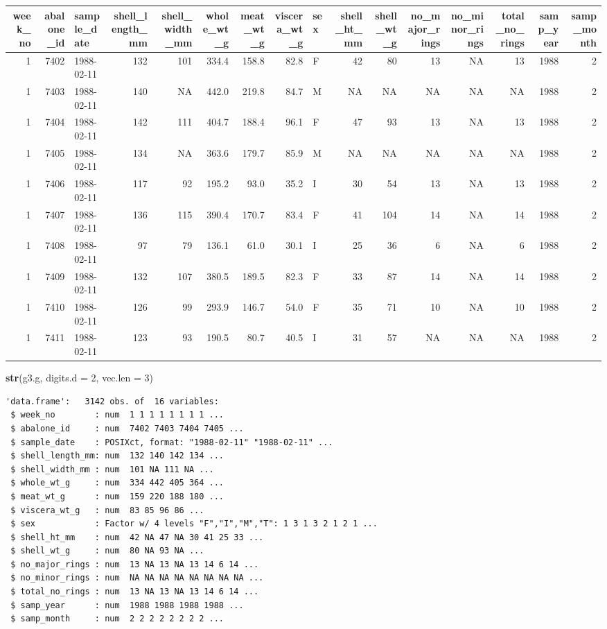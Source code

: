 \documentclass[]{article}
\newenvironment{Shaded}{\begin{snugshade}}{\end{snugshade}}
\newcommand{\DataTypeTok}[1]{\textcolor[rgb]{0.13,0.29,0.53}{#1}}
\newcommand{\DecValTok}[1]{\textcolor[rgb]{0.00,0.00,0.81}{#1}}
\newcommand{\KeywordTok}[1]{\textcolor[rgb]{0.13,0.29,0.53}{\textbf{#1}}}
\newcommand{\NormalTok}[1]{#1}
\begin{document}
\begin{tabular}{r|r|l|r|r|r|r|r|l|r|r|r|r|r|r|r}
\hline
week\_no & abalone\_id & sample\_date & shell\_length\_mm & shell\_width\_mm & whole\_wt\_g & meat\_wt\_g & viscera\_wt\_g & sex & shell\_ht\_mm & shell\_wt\_g & no\_major\_rings & no\_minor\_rings & total\_no\_rings & samp\_year & samp\_month\\
\hline
1 & 7402 & 1988-02-11 & 132 & 101 & 334.4 & 158.8 & 82.8 & F & 42 & 80 & 13 & NA & 13 & 1988 & 2\\
\hline
1 & 7403 & 1988-02-11 & 140 & NA & 442.0 & 219.8 & 84.7 & M & NA & NA & NA & NA & NA & 1988 & 2\\
\hline
1 & 7404 & 1988-02-11 & 142 & 111 & 404.7 & 188.4 & 96.1 & F & 47 & 93 & 13 & NA & 13 & 1988 & 2\\
\hline
1 & 7405 & 1988-02-11 & 134 & NA & 363.6 & 179.7 & 85.9 & M & NA & NA & NA & NA & NA & 1988 & 2\\
\hline
1 & 7406 & 1988-02-11 & 117 & 92 & 195.2 & 93.0 & 35.2 & I & 30 & 54 & 13 & NA & 13 & 1988 & 2\\
\hline
1 & 7407 & 1988-02-11 & 136 & 115 & 390.4 & 170.7 & 83.4 & F & 41 & 104 & 14 & NA & 14 & 1988 & 2\\
\hline
1 & 7408 & 1988-02-11 & 97 & 79 & 136.1 & 61.0 & 30.1 & I & 25 & 36 & 6 & NA & 6 & 1988 & 2\\
\hline
1 & 7409 & 1988-02-11 & 132 & 107 & 380.5 & 189.5 & 82.3 & F & 33 & 87 & 14 & NA & 14 & 1988 & 2\\
\hline
1 & 7410 & 1988-02-11 & 126 & 99 & 293.9 & 146.7 & 54.0 & F & 35 & 71 & 10 & NA & 10 & 1988 & 2\\
\hline
1 & 7411 & 1988-02-11 & 123 & 93 & 190.5 & 80.7 & 40.5 & I & 31 & 57 & NA & NA & NA & 1988 & 2\\
\hline
\end{tabular}

\begin{Shaded}
\begin{Highlighting}[]
\KeywordTok{str}\NormalTok{(g3.g, }\DataTypeTok{digits.d =} \DecValTok{2}\NormalTok{, }\DataTypeTok{vec.len =} \DecValTok{3}\NormalTok{) }
\end{Highlighting}
\end{Shaded}

\begin{verbatim}
'data.frame':   3142 obs. of  16 variables:
 $ week_no        : num  1 1 1 1 1 1 1 1 ...
 $ abalone_id     : num  7402 7403 7404 7405 ...
 $ sample_date    : POSIXct, format: "1988-02-11" "1988-02-11" ...
 $ shell_length_mm: num  132 140 142 134 ...
 $ shell_width_mm : num  101 NA 111 NA ...
 $ whole_wt_g     : num  334 442 405 364 ...
 $ meat_wt_g      : num  159 220 188 180 ...
 $ viscera_wt_g   : num  83 85 96 86 ...
 $ sex            : Factor w/ 4 levels "F","I","M","T": 1 3 1 3 2 1 2 1 ...
 $ shell_ht_mm    : num  42 NA 47 NA 30 41 25 33 ...
 $ shell_wt_g     : num  80 NA 93 NA ...
 $ no_major_rings : num  13 NA 13 NA 13 14 6 14 ...
 $ no_minor_rings : num  NA NA NA NA NA NA NA NA ...
 $ total_no_rings : num  13 NA 13 NA 13 14 6 14 ...
 $ samp_year      : num  1988 1988 1988 1988 ...
 $ samp_month     : num  2 2 2 2 2 2 2 2 ...
\end{verbatim}
\end{document}
